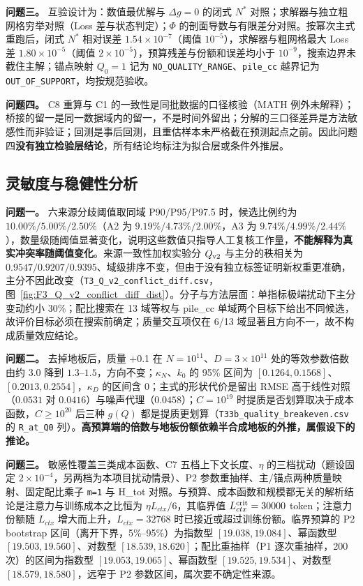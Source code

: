 \textbf{问题三。} 互验设计为：数值最优解与 $\Delta g=0$ 的闭式 $N^*$ 对照；求解器与独立粗网格穷举对照（Loss 差与状态判定）；$\Phi$ 的剖面导数与有限差分对照。按幂次主式重跑后，闭式 $N^*$ 相对误差 $1.54\times10^{-7}$（阈值 $10^{-5}$），求解器与粗网格最大 Loss 差 $1.80\times10^{-5}$（阈值 $2\times10^{-5}$），预算残差与份额和误差均小于 $10^{-9}$，搜索边界未截住主解；锚点映射 $Q_0=1$ 记为 \texttt{NO\_QUALITY\_RANGE}、\texttt{pile\_cc} 越界记为 \texttt{OUT\_OF\_SUPPORT}，均按规范验收。

\textbf{问题四。} C8 重算与 C1 的一致性是同批数据的口径核验（MATH 例外未解释）；桥接的留一是同一数据域内的留一，不是时间外留出；分解的三口径差异是方法敏感性而非验证；回测是事后回测，且重估样本未严格截在预测起点之前。因此问题四\textbf{没有独立检验层结论}，所有结论均标注为拟合层或条件外推层。

\subsection{灵敏度与稳健性分析}
\label{sec:6.2}

\textbf{问题一。} 六来源分歧阈值取同域 P90/P95/P97.5 时，候选比例约为 $10.00\%/5.00\%/2.50\%$（A2 为 $9.19\%/4.73\%/2.00\%$，A3 为 $9.74\%/4.99\%/2.44\%$），数量级随阈值显著变化，说明这些数值只指导人工复核工作量，\textbf{不能解释为真实冲突率随阈值变化}。来源一致性加权实验分 $Q_{\rm v2}$ 与主分的秩相关为 $0.9547/0.9207/0.9395$、域级排序不变，但由于没有独立标签证明新权重更准确，主分不因此改变（\texttt{T3\_Q\_v2\_conflict\_diff.csv}，图~\ref{fig:F3_Q_v2_conflict_diff_dist}）。分子与方法层面：单指标极端扰动下主分变动约小 30\%；配比搜索在 13 域等权与 pile\_cc 单域两个目标下给出不同候选，故评价目标必须在搜索前确定；质量交互项仅在 6/13 域显著且方向不一，故不构成质量效应结论。

\textbf{问题二。} 去掉地板后，质量 +0.1 在 $N=10^{11}$、$D=3\times10^{11}$ 处的等效参数倍数由约 $3.0$ 降到 $1.3$–$1.5$，方向不变；$\kappa_N$、$k_0$ 的 95\% 区间为 $[0.1264,0.1568]$、$[0.2013,0.2554]$，$\kappa_D$ 的区间含 0；主式的形状代价是留出 RMSE 高于线性对照（$0.0531$ 对 $0.0416$）与噪声代理（$0.0458$）；$C=10^{19}$ 时提质是否划算取决于成本函数，$C\ge10^{20}$ 后三种 $g(Q)$ 都是提质更划算（\texttt{T33b\_quality\_breakeven.csv} 的 \texttt{R\_at\_Q0} 列）。\textbf{高预算端的倍数与地板份额依赖半合成地板的外推，属假设下的推论。}

\textbf{问题三。} 敏感性覆盖三类成本函数、C7 五档上下文长度、$\eta$ 的三档扰动（题设固定 $2\times10^{-4}$，另两档为本项目扰动情景）、P2 参数重抽样、主/锚点两种质量映射、固定配比乘子 \texttt{m=1} 与 H\_tot 对照。与预算、成本函数和规模都无关的解析结论是注意力与训练成本之比恒为 $\eta L_{ctx}/6$，其临界值 $L_{ctx}^{\rm crit}=30000$ token；注意力份额随 $L_{ctx}$ 增大而上升，$L_{ctx}=32768$ 时已接近或超过训练份额。临界预算的 P2 bootstrap 区间（离开下界，5\%–95\%）为指数型 $[19.038,19.084]$、幂函数型 $[19.503,19.560]$、对数型 $[18.539,18.620]$；配比重抽样（P1 逐次重抽样，200 次）的区间为指数型 $[19.053,19.065]$、幂函数型 $[19.525,19.534]$、对数型 $[18.579,18.580]$，远窄于 P2 参数区间，属次要不确定性来源。

